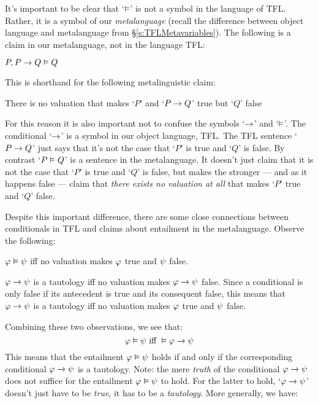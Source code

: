 It's important to be clear that `$\vDash$' is not a symbol in the language of TFL. Rather, it is a symbol of our \emph{metalanguage} (recall the difference between object language and metalanguage from \S\ref{s:TFLMetavariables}). The following is a claim in our metalanguage, not in the language TFL:
	\begin{ebullet}
		\item $P, P \rightarrow Q \vDash Q$
	\end{ebullet}
This is shorthand for the following metalinguistic claim:
	\begin{ebullet}
		\item There is no valuation that makes `$P$' and `$P \rightarrow Q$' true but `$Q$' false
	\end{ebullet}

For this reason it is also important not to confuse the symbols `$\rightarrow$' and `$\vDash$'. The conditional `$\rightarrow$' is a symbol in our object language, TFL.  The TFL sentence `$P \rightarrow Q$' just says that it's not the case that `$P$' is true and `$Q$' is false.  By contrast `$P \vDash Q$' is a sentence in the metalanguage.  It doesn't just claim that it is not the case that `$P$' is true and `$Q$' is false, but makes the stronger --- and as it happens false --- claim that \emph{there exists no valuation at all} that makes `$P$' true and `$Q$' false.

Despite this important difference, there are some close connections between conditionals in TFL and claims about entailment in the metalanguage.  Observe the following:
\begin{ebullet}
\item $\mathcal{\varphi} \vDash \mathcal{\psi}$ iff no valuation makes $\mathcal{\varphi}$ true and $\mathcal{\psi}$ false.
\item $\mathcal{\varphi} \rightarrow \mathcal{\psi}$ is a tautology iff no valuation  makes $\mathcal{\varphi} \rightarrow \mathcal{\psi}$ false. Since a conditional is only false if its antecedent is true and its consequent false, this means that $\mathcal{\varphi} \rightarrow \mathcal{\psi}$ is a tautology iff no valuation makes $\mathcal{\varphi}$ true and $\mathcal{\psi}$ false.
\end{ebullet}
Combining these two observations, we see that:
$$\mathcal{\varphi} \vDash \mathcal{\psi} \text{ iff } \vDash \mathcal{\varphi} \rightarrow \mathcal{\psi}$$
 This means that the entailment $\mathcal{\varphi} \vDash \mathcal{\psi}$ holds if and only if the corresponding conditional $\mathcal{\varphi} \rightarrow \mathcal{\psi}$ is a tautology.  Note: the mere \emph{truth} of the conditional $\mathcal{\varphi} \rightarrow \mathcal{\psi}$ does not suffice for the entailment $\mathcal{\varphi} \vDash \mathcal{\psi}$ to hold.  For the latter to hold, `$\mathcal{\varphi} \rightarrow \mathcal{\psi}$' doesn't just have to be \emph{true}, it has to be a \emph{tautology}.  More generally, we have:

